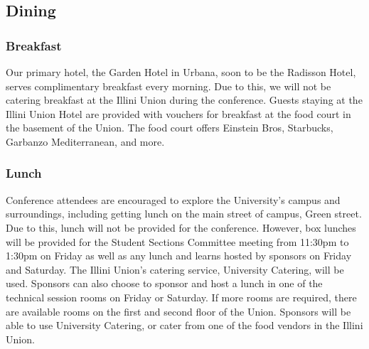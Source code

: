 \begin{table}
\caption{Cost of Hotels}
\label{table:hotels}
	\centering
\end{table}

\subsection{Dining}
\subsubsection{Breakfast}
Our primary hotel, the Garden Hotel in Urbana, soon to be the Radisson Hotel, serves complimentary breakfast every morning. Due to this, we will not be catering breakfast at the Illini Union during the conference. Guests staying at the Illini Union Hotel are provided with vouchers for breakfast at the food court in the basement of the Union. The food court offers Einstein Bros, Starbucks, Garbanzo Mediterranean, and more. 
\subsubsection{Lunch}
Conference attendees are encouraged to explore the University’s campus and surroundings, including getting lunch on the main street of campus, Green street. Due to this, lunch will not be provided for the conference. However, box lunches will be provided for the Student Sections Committee meeting from 11:30pm to 1:30pm on Friday as well as any lunch and learns hosted by sponsors on Friday and Saturday. The Illini Union’s catering service, University Catering, will be used. Sponsors can also choose to sponsor and host a lunch in one of the technical session rooms on Friday or Saturday. If more rooms are required, there are available rooms on the first and second floor of the Union. Sponsors will be able to use University Catering, or cater from one of the food vendors in the Illini Union.
